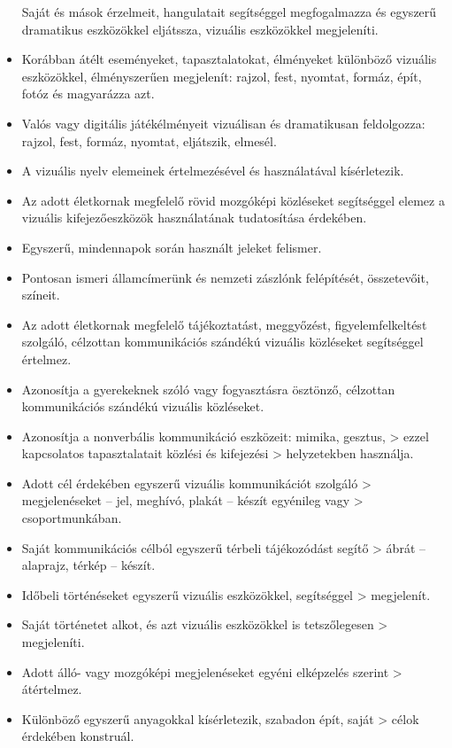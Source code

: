 \begin{itemize}
  Saját és mások érzelmeit, hangulatait segítséggel megfogalmazza és
  egyszerű dramatikus eszközökkel eljátssza, vizuális eszközökkel
  megjeleníti.
\item
  Korábban átélt eseményeket, tapasztalatokat, élményeket különböző
  vizuális eszközökkel, élményszerűen megjelenít: rajzol, fest, nyomtat,
  formáz, épít, fotóz és magyarázza azt.
\item
  Valós vagy digitális játékélményeit vizuálisan és dramatikusan
  feldolgozza: rajzol, fest, formáz, nyomtat, eljátszik, elmesél.
\item
  A vizuális nyelv elemeinek értelmezésével és használatával
  kísérletezik.
\item
  Az adott életkornak megfelelő rövid mozgóképi közléseket segítséggel
  elemez a vizuális kifejezőeszközök használatának tudatosítása
  érdekében.
\item
  Egyszerű, mindennapok során használt jeleket felismer.
\item
  Pontosan ismeri államcímerünk és nemzeti zászlónk felépítését,
  összetevőit, színeit.
\item
  Az adott életkornak megfelelő tájékoztatást, meggyőzést,
  figyelemfelkeltést szolgáló, célzottan kommunikációs szándékú vizuális
  közléseket segítséggel értelmez.
\item
  Azonosítja a gyerekeknek szóló vagy fogyasztásra ösztönző, célzottan
  kommunikációs szándékú vizuális közléseket.
\item
  Azonosítja a nonverbális kommunikáció eszközeit: mimika, gesztus,
  \textgreater{} ezzel kapcsolatos tapasztalatait közlési és kifejezési
  \textgreater{} helyzetekben használja.
\item
  Adott cél érdekében egyszerű vizuális kommunikációt szolgáló
  \textgreater{} megjelenéseket -- jel, meghívó, plakát -- készít
  egyénileg vagy \textgreater{} csoportmunkában.
\item
  Saját kommunikációs célból egyszerű térbeli tájékozódást segítő
  \textgreater{} ábrát -- alaprajz, térkép -- készít.
\item
  Időbeli történéseket egyszerű vizuális eszközökkel, segítséggel
  \textgreater{} megjelenít.
\item
  Saját történetet alkot, és azt vizuális eszközökkel is tetszőlegesen
  \textgreater{} megjeleníti.
\item
  Adott álló- vagy mozgóképi megjelenéseket egyéni elképzelés szerint
  \textgreater{} átértelmez.
\item
  Különböző egyszerű anyagokkal kísérletezik, szabadon épít, saját
  \textgreater{} célok érdekében konstruál.
\end{itemize}

